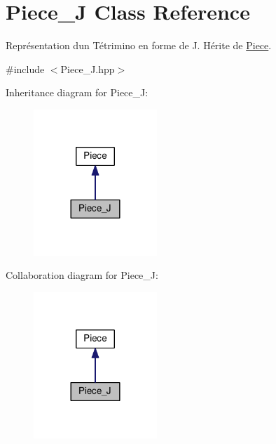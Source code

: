 \hypertarget{classPiece__J}{}\section{Piece\+\_\+J Class Reference}
\label{classPiece__J}


Représentation d\textquotesingle{}un Tétrimino en forme de J. Hérite de \hyperlink{classPiece}{Piece}.  




{\ttfamily \#include $<$Piece\+\_\+\+J.\+hpp$>$}



Inheritance diagram for Piece\+\_\+J\+:
\nopagebreak
\begin{figure}[H]
\begin{center}
\leavevmode
\includegraphics[width=132pt]{classPiece__J__inherit__graph}
\end{center}
\end{figure}


Collaboration diagram for Piece\+\_\+J\+:
\nopagebreak
\begin{figure}[H]
\begin{center}
\leavevmode
\includegraphics[width=132pt]{classPiece__J__coll__graph}
\end{center}
\end{figure}
